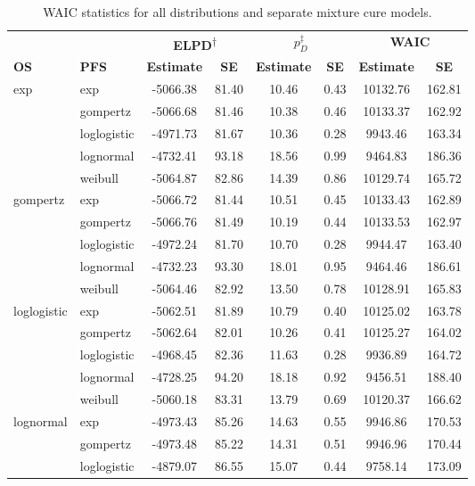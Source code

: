 \documentclass[AMA,STIX1COL]{WileyNJD-v2}
\begin{document}
\begin{table}[H]
\caption{WAIC statistics for all distributions and separate mixture cure models. \label{tab:waic_separate}}
\centering
\begin{tabular}{l l c c c c c c}
\toprule
\multicolumn{1}{l}{} & \multicolumn{1}{l}{} & \multicolumn{2}{c}{\textbf{ELPD\textsuperscript{$\dagger$}}} & \multicolumn{2}{c}{\textbf{$p_D^{\ddagger}$}} & \multicolumn{2}{c}{\textbf{WAIC}} \\
\cmidrule{3-4}\cmidrule{5-6}\cmidrule{7-8}
\textbf{OS} & \textbf{PFS} & \textbf{Estimate} & \textbf{SE} & \textbf{Estimate} & \textbf{SE} & \textbf{Estimate} & \textbf{SE}\\
\midrule
exp & exp & -5066.38 & 81.40 & 10.46 & 0.43 & 10132.76 & 162.81\\
 & gompertz & -5066.68 & 81.46 & 10.38 & 0.46 & 10133.37 & 162.92\\
 & loglogistic & -4971.73 & 81.67 & 10.36 & 0.28 & 9943.46 & 163.34\\
 & lognormal & -4732.41 & 93.18 & 18.56 & 0.99 & 9464.83 & 186.36\\
 & weibull & -5064.87 & 82.86 & 14.39 & 0.86 & 10129.74 & 165.72\\
gompertz & exp & -5066.72 & 81.44 & 10.51 & 0.45 & 10133.43 & 162.89\\
 & gompertz & -5066.76 & 81.49 & 10.19 & 0.44 & 10133.53 & 162.97\\
 & loglogistic & -4972.24 & 81.70 & 10.70 & 0.28 & 9944.47 & 163.40\\
 & lognormal & -4732.23 & 93.30 & 18.01 & 0.95 & 9464.46 & 186.61\\
 & weibull & -5064.46 & 82.92 & 13.50 & 0.78 & 10128.91 & 165.83\\
loglogistic & exp & -5062.51 & 81.89 & 10.79 & 0.40 & 10125.02 & 163.78\\
 & gompertz & -5062.64 & 82.01 & 10.26 & 0.41 & 10125.27 & 164.02\\
 & loglogistic & -4968.45 & 82.36 & 11.63 & 0.28 & 9936.89 & 164.72\\
 & lognormal & -4728.25 & 94.20 & 18.18 & 0.92 & 9456.51 & 188.40\\
 & weibull & -5060.18 & 83.31 & 13.79 & 0.69 & 10120.37 & 166.62\\
lognormal & exp & -4973.43 & 85.26 & 14.63 & 0.55 & 9946.86 & 170.53\\
 & gompertz & -4973.48 & 85.22 & 14.31 & 0.51 & 9946.96 & 170.44\\
 & loglogistic & -4879.07 & 86.55 & 15.07 & 0.44 & 9758.14 & 173.09\\

\end{tabular}
\end{table}
\end{document}
